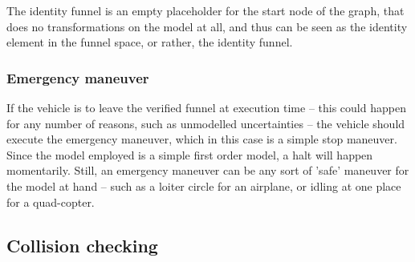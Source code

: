 The identity funnel is an empty placeholder for the start node of the graph,
that does no transformations on the model at all, and thus can be seen as the
identity element in the funnel space, or rather, the identity funnel.

\subsubsection{Emergency maneuver}

If the vehicle is to leave the verified funnel at execution time -- this could
happen for any number of reasons, such as unmodelled uncertainties -- the
vehicle should execute the emergency maneuver, which in this case is a simple
stop maneuver. Since the model employed is a simple first order model, a halt
will happen momentarily. Still, an emergency maneuver can be any sort of 'safe'
maneuver for the model at hand -- such as a loiter circle for an airplane, or
idling at one place for a quad-copter.

\subsection{Collision checking}

